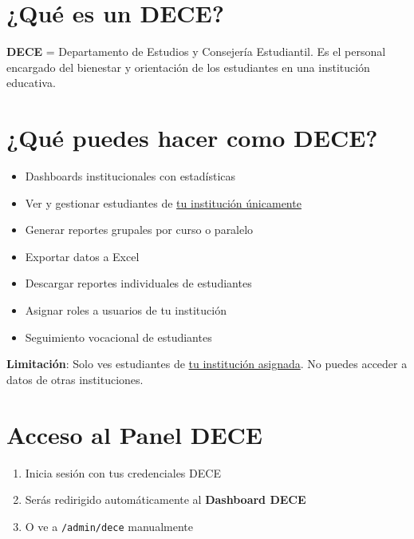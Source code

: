 \documentclass[12pt, a4paper]{report}
\begin{document}
\section{¿Qué es un DECE?}
\textbf{DECE} = Departamento de Estudios y Consejería Estudiantil. Es el personal encargado del bienestar y orientación de los estudiantes en una institución educativa.

\section{¿Qué puedes hacer como DECE?}
\begin{itemize}
    \item Dashboards institucionales con estadísticas
    \item Ver y gestionar estudiantes de \underline{tu institución únicamente}
    \item Generar reportes grupales por curso o paralelo
    \item Exportar datos a Excel
    \item Descargar reportes individuales de estudiantes
    \item Asignar roles a usuarios de tu institución
    \item Seguimiento vocacional de estudiantes
\end{itemize}

\textbf{Limitación}: Solo ves estudiantes de \underline{tu institución asignada}. No puedes acceder a datos de otras instituciones.

\section{Acceso al Panel DECE}
\begin{enumerate}
    \item Inicia sesión con tus credenciales DECE
    \item Serás redirigido automáticamente al \textbf{Dashboard DECE}
    \item O ve a \texttt{/admin/dece} manualmente
\end{enumerate}
\end{document}
